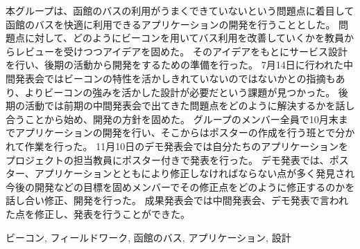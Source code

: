 \documentclass[openany,11pt,papersize]{jsbook}
\begin{document}
  \maketitle

  \frontmatter

  \begin{jabstract}

  


本グループは、函館のバスの利用がうまくできていないという問題点に着目して函館のバスを快適に利用できるアプリケーションの開発を行うこととした。
問題点に対して、どのようにビーコンを用いてバス利用を改善していくかを教員からレビューを受けつつアイデアを固めた。
そのアイデアをもとにサービス設計を行い、後期の活動から開発をするための準備を行った。
7月14日に行われた中間発表会ではビーコンの特性を活かしきれていないのではないかとの指摘もあり、よりビーコンの強みを活かした設計が必要だという課題が見つかった。
後期の活動では前期の中間発表会で出てきた問題点をどのように解決するかを話し合うことから始め、開発の方針を固めた。
グループのメンバー全員で10月末までアプリケーションの開発を行い、そこからはポスターの作成を行う班とで分かれて作業を行った。
11月10日のデモ発表会では自分たちのアプリケーションをプロジェクトの担当教員にポスター付きで発表を行った。
デモ発表では、ポスター、アプリケーションとともにより修正しなければならない点が多く発見され今後の開発などの目標を固めメンバーでその修正点をどのように修正するのかを話し合い修正、開発を行った。
成果発表会では中間発表会、デモ発表で言われた点を修正し、発表を行うことができた。

\begin{jkeyword}
ビーコン, フィールドワーク, 函館のバス, アプリケーション, 設計
\end{jkeyword}
\end{jabstract}
\end{document}
